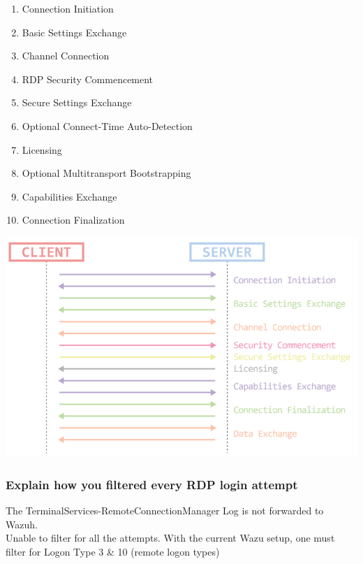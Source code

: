 \begin{minipage}{0.45\linewidth}
    \begin{enumerate}
        \item Connection Initiation
        \item Basic Settings Exchange
        \item Channel Connection
        \item RDP Security Commencement
        \item Secure Settings Exchange
        \item Optional Connect-Time Auto-Detection
        \item Licensing
        \item Optional Multitransport Bootstrapping
        \item Capabilities Exchange
        \item Connection Finalization
    \end{enumerate}
\end{minipage}
\begin{minipage}{0.5\linewidth}
    \begin{center}
        \includegraphics[width=1.2\linewidth]{img/rdp_phases}
        \vspace{-8pt}
    \end{center}
\end{minipage}

\subsubsection{Explain how you filtered every RDP login attempt}
The TerminalServices-RemoteConnectionManager Log is not forwarded to Wazuh.\\
Unable to filter for all the attempts.
With the current Wazu setup, one must filter for Logon Type 3 \& 10 (remote logon types)\\

